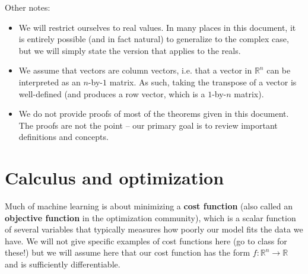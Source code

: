 \documentclass{article}
\newcommand{\R}{\mathbb{R}}
\newcommand{\term}[1]{\textbf{#1}}
\begin{document}
\vspace{0.5cm}
Other notes:
\begin{itemize}
\item We will restrict ourselves to real values. In many places in this document, it is entirely possible (and in fact natural) to generalize to the complex case, but we will simply state the version that applies to the reals.

\item We assume that vectors are column vectors, i.e. that a vector in $\R^n$ can be interpreted as an $n$-by-$1$ matrix. As such, taking the transpose of a vector is well-defined (and produces a row vector, which is a $1$-by-$n$ matrix).

\item We do not provide proofs of most of the theorems given in this document. The proofs are not the point -- our primary goal is to review important definitions and concepts.
\end{itemize}

\newpage
\section{Calculus and optimization}
Much of machine learning is about minimizing a \term{cost function} (also called an \term{objective function} in the optimization community), which is a scalar function of several variables that typically measures how poorly our model fits the data we have. We will not give specific examples of cost functions here (go to class for these!) but we will assume here that our cost function has the form $f : \R^n \to \R$ and is sufficiently differentiable.
\end{document}
